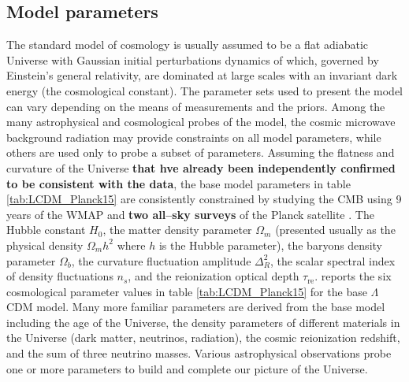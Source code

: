 \documentclass[paper=a4, fontsize=11pt]{scrartcl} %
\numberwithin{equation}{section} %
\numberwithin{figure}{section} %
\numberwithin{table}{section} %
\begin{document}

\subsection{Model parameters}
\label{subsec:Model_parameters}
The standard model of cosmology is usually assumed to be a flat adiabatic Universe with Gaussian initial perturbations dynamics of which, governed by Einstein's general relativity, are dominated at large scales with an invariant dark energy (the cosmological constant). The parameter sets used to present the model can vary depending on the means of measurements and the priors. Among the many astrophysical and cosmological probes of the model, the cosmic microwave background radiation may provide constraints on all model parameters, while others are used only to probe a subset of parameters. Assuming the flatness and curvature of the Universe {\bf that hve already been independently confirmed to be consistent with the data}, the base model parameters in table \ref{tab:LCDM_Planck15} are consistently constrained by studying the CMB using 9 years of the WMAP \citep[][]{WMAP9} and {\bf two all--sky surveys} of the Planck satellite \citep[][]{Planck2015}. The Hubble constant $H_0$, the matter density parameter $\Omega_m$ (presented usually as the physical density $\Omega_m h^2$ where $h$ is the Hubble parameter), the baryons density parameter $\Omega_b$, the curvature fluctuation amplitude $\Delta^2_R$, the scalar spectral index of density fluctuations $n_s$, and the reionization optical depth $\tau_\mathrm{re}$. \citet[][]{Planck2015} reports the six cosmological parameter values in table \ref{tab:LCDM_Planck15} for the base $\Lambda$CDM model. Many more familiar parameters are derived from the base model including the age of the Universe, the density parameters of different materials in the Universe (dark matter, neutrinos, radiation), the cosmic reionization redshift, and the sum of three neutrino masses. Various astrophysical observations probe one or more parameters to build and complete our picture of the Universe.
\end{document}
